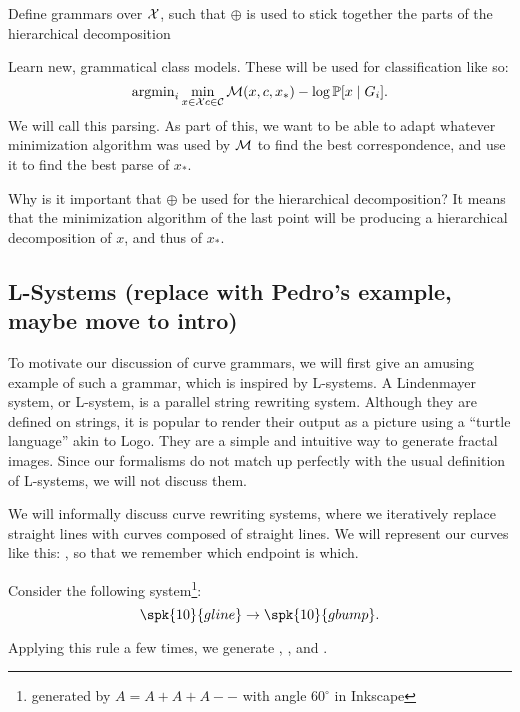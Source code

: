 \documentclass{article}
\begin{document}
\item Define grammars over ${\mathcal X}$, such that $\oplus$ is used to stick
  together the parts of the hierarchical decomposition

\item Learn new, grammatical class models. These will be used for
  classification like so:
$$\operatorname{argmin}_i \min_{x\in {\mathcal X} c\in {\mathcal C}} {\mathcal M}(x, c, x_*) - \log\mathbb{P}[x
    \mid G_i].$$ We will call this parsing.  As part of this, we want
  to be able to adapt whatever minimization algorithm was used by
  ${\mathcal M}$ to find the best correspondence, and use it to find the best
  parse of $x_*$.  
\eitem

Why is it important that $\oplus$ be used for the hierarchical
decomposition? It means that the minimization algorithm of the last
point will be producing a hierarchical decomposition of $x$, and thus
of $x_*$.

\subsection{L-Systems (replace with Pedro's example, maybe move to intro)}

To motivate our discussion of curve grammars, we will first give an
amusing example of such a grammar, which is inspired by L-systems. A
Lindenmayer system, or L-system, is a parallel string rewriting
system. 
Although they are defined on strings, it is popular to render
their output as a picture using a ``turtle language'' akin to
Logo. They are a simple and intuitive way to generate fractal
images. Since our formalisms do not match up perfectly with the usual
definition of L-systems, we will not discuss them.

We will informally discuss curve rewriting systems, where we
iteratively replace straight lines with curves composed of straight
lines. We will represent our curves like this: , so that
we remember which endpoint is which.

Consider the following system\footnote{generated by $A=A+A+A--$ with
  angle $60^\circ$ in Inkscape}:
$$ \spk{10}{gline} \to \spk{10}{gbump} .$$

Applying this rule a few times, we generate , ,
 and .

\end{document}
